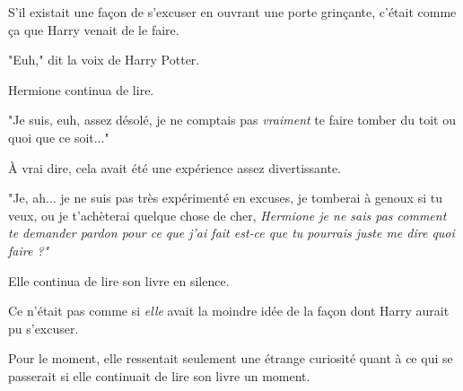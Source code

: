 S'il existait une façon de s'excuser en ouvrant une porte grinçante, c'était comme ça que Harry venait de le faire.

"Euh," dit la voix de Harry Potter.

Hermione continua de lire.

"Je suis, euh, assez désolé, je ne comptais pas \emph{vraiment}  te faire tomber du toit ou quoi que ce soit..."

À vrai dire, cela avait été une expérience assez divertissante.

"Je, ah... je ne suis pas très expérimenté en excuses, je tomberai à genoux si tu veux, ou je t'achèterai quelque chose de cher, \emph{Hermione je ne sais pas comment te demander pardon pour ce que j'ai fait est-ce que tu pourrais juste me dire quoi faire ?"} 

Elle continua de lire son livre en silence.

Ce n'était pas comme si \emph{elle}  avait la moindre idée de la façon dont Harry aurait pu s'excuser.

Pour le moment, elle ressentait seulement une étrange curiosité quant à ce qui se passerait si elle continuait de lire son livre un moment.

